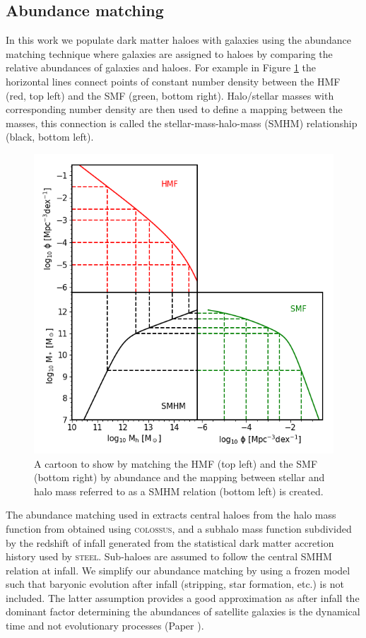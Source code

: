 \subsection{Abundance matching}
\label{C2:SubSec:AbnMtch}
In this work we populate dark matter haloes with galaxies using the abundance matching technique where galaxies are assigned to haloes by comparing the relative abundances of galaxies and haloes. For example in Figure \ref{fig:Abn_Toon} the horizontal lines connect points of constant number density between the HMF (red, top left) and the SMF (green, bottom right). Halo/stellar masses with corresponding number density are then used to define a mapping between the masses, this connection is called the stellar-mass-halo-mass (SMHM) relationship (black, bottom left).

\begin{figure}[h]
    \centering
    \includegraphics[width = \linewidth]{Figures/Chapter2/AbundaceMatching.png}
    \caption{A cartoon to show by matching the HMF (top left) and the SMF (bottom right) by abundance and the mapping between stellar and halo mass referred to as a SMHM relation (bottom left) is created.}
    \label{fig:Abn_Toon}
\end{figure}

The abundance matching used in \steel extracts central haloes from the halo mass function from \citet{Despali2016TheDefinitions} obtained using \textsc{colossus}\cite{Diemer2018COLOSSUS:Halos}, and a subhalo mass function subdivided by the redshift of infall generated from the statistical dark matter accretion history used by \textsc{steel}. Sub-haloes are assumed to follow the central SMHM relation at infall. We simplify our abundance matching by using a frozen model such that baryonic evolution after infall (stripping, star formation, etc.) is not included. The latter assumption provides a good approximation as after infall the dominant factor determining the abundances of satellite galaxies is the dynamical time and not evolutionary processes (Paper ).

